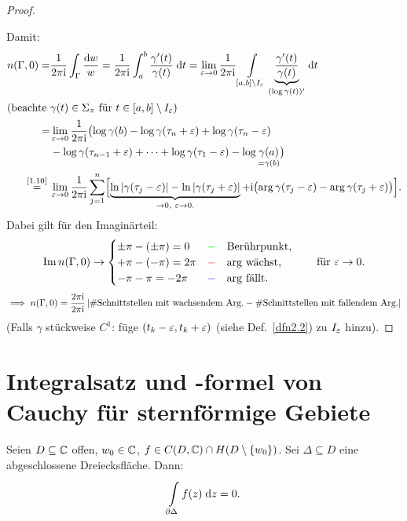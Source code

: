 \documentclass[a4paper,twoside,DIV15,BCOR12mm]{scrbook}
\begin{document}
\begin{proof}
\begin{center}
\end{center}

Damit:
\begin{align*}
n(\Gamma,0) = &\frac{1}{2\pi\i}\int_\Gamma\frac{\d w}{w} = \frac{1}{2\pi\i}\integral{a}{b}{\frac{\gamma^\prime(t)}{\gamma(t)}}{t} = \lim_{\ep\ra 0}\frac{1}{2\pi\i}\Integral{[a,b]\setminus I_\ep}{}{\underbrace{\frac{\gamma^\prime(t)}{\gamma(t)}}_{(\log\gamma(t))^\prime}}{t}\\
\intertext{(beachte $\gamma(t)\in\Sigma_\pi$ für $t\in[a,b]\setminus I_\ep$)}
=&\lim_{\ep\ra 0}\frac{1}{2\pi\i}\bigl(\log\gamma(b)-\log\gamma(\tau_n+\ep)+\log\gamma(\tau_n-\ep)\\
&-\log\gamma(\tau_{n-1}+\ep)+\dotsb+\log\gamma(\tau_1-\ep)-\log\underset{=\gamma(b)}{\gamma(a)}\bigr)\\
\nach{=}{\eqref{1.10}}&\lim_{\ep\ra0}\frac{1}{2\pi\i}\sum_{j=1}^n\Bigl[\underbrace{\ln\abs{\gamma(\tau_j-\ep)}-\ln\abs{\gamma(\tau_j+\ep)}}_{\ra0,\ \ep\ra0.}+\i\bigl(\arg\gamma(\tau_j-\ep)-\arg\gamma(\tau_j+\ep)\bigr)\Bigr].
\end{align*}
Dabei gilt für den Imaginärteil:
\[\operatorname{Im}{n(\Gamma,0)} \rightarrow\begin{cases}\pm\pi-(\pm\pi) = 0&\text{\textcolor{green}{$-\quad$}Berührpunkt,}\\+\pi-(-\pi) = 2\pi&\text{\textcolor{red}{$-\quad$}$\arg$ wächst,}\\-\pi-\pi=-2\pi&\text{\textcolor{blue}{$-\quad$}$\arg$ fällt.}\end{cases}\qquad\text{für }\varepsilon\rightarrow 0.\]
\[\implies n(\Gamma,0) = \frac{2\pi\mathrm{i}}{2\pi\mathrm{i}}\left\lvert\text{\#Schnittstellen mit wachsendem Arg.} - \text{\#Schnittstellen mit fallendem Arg.}\right\lvert\]
(Falls $\gamma$ stückweise $C^1$: füge $(t_k-\varepsilon,t_k+\varepsilon)$ (siehe Def.~\ref{dfn2.2}) zu $I_\varepsilon$ hinzu).
\end{proof}

\section{Integralsatz und -formel von Cauchy für sternförmige Gebiete}

\begin{satz}\label{satz2.19} Seien $D\subseteq\mathbb{C}$ offen, $w_0\in\mathbb{C}$, $f\in C(D,\mathbb{C})\cap H(D\setminus\{w_0\})$. Sei $\Delta\subseteq D$ eine abgeschlossene Dreiecksfläche. Dann:
\[\int\limits_{\partial\Delta}^{}{f(z)}\;\mathrm{d}z=0.\]
\end{satz}
\end{document}
